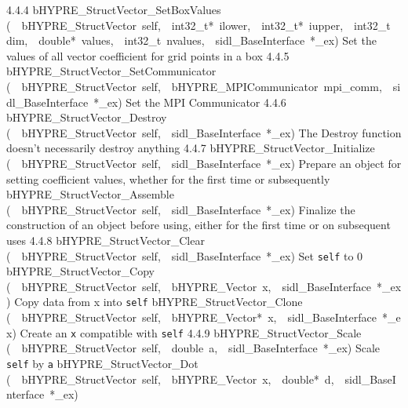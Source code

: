\documentclass{article}
\begin{document}
\begin{cxxentry}
\begin{cxxentry}
\begin{cxxnames}
        {4.4.4}
        {bHYPRE\_StructVector\_SetBoxValues}
        {(\ \ bHYPRE\_StructVector\ self,\ \ int32\_t*\ ilower,\ \ int32\_t*\ iupper,\ \ int32\_t\ dim,\ \ double*\ values,\ \ int32\_t\ nvalues,\ \ sidl\_BaseInterface\ *\_ex)}
        {
Set the values of all vector coefficient for grid points in a box}
        {4.4.5}
        {bHYPRE\_StructVector\_SetCommunicator}
        {(\ \ bHYPRE\_StructVector\ self,\ \ bHYPRE\_MPICommunicator\ mpi\_comm,\ \ sidl\_BaseInterface\ *\_ex)}
        {
Set the MPI Communicator}
        {4.4.6}
        {bHYPRE\_StructVector\_Destroy}
        {(\ \ bHYPRE\_StructVector\ self,\ \ sidl\_BaseInterface\ *\_ex)}
        {
The Destroy function doesn't necessarily destroy anything}
        {4.4.7}
        {bHYPRE\_StructVector\_Initialize}
        {(\ \ bHYPRE\_StructVector\ self,\ \ sidl\_BaseInterface\ *\_ex)}
        {
Prepare an object for setting coefficient values, whether for
the first time or subsequently}
        {}
\label{cxx.4.4.16}
        {bHYPRE\_StructVector\_Assemble}
        {(\ \ bHYPRE\_StructVector\ self,\ \ sidl\_BaseInterface\ *\_ex)}
        {
Finalize the construction of an object before using, either
for the first time or on subsequent uses}
        {4.4.8}
        {bHYPRE\_StructVector\_Clear}
        {(\ \ bHYPRE\_StructVector\ self,\ \ sidl\_BaseInterface\ *\_ex)}
        {
Set {\tt self} to 0}
        {}
\label{cxx.4.4.17}
        {bHYPRE\_StructVector\_Copy}
        {(\ \ bHYPRE\_StructVector\ self,\ \ bHYPRE\_Vector\ x,\ \ sidl\_BaseInterface\ *\_ex)}
        {
Copy data from x into {\tt self}}
        {}
\label{cxx.4.4.18}
        {bHYPRE\_StructVector\_Clone}
        {(\ \ bHYPRE\_StructVector\ self,\ \ bHYPRE\_Vector*\ x,\ \ sidl\_BaseInterface\ *\_ex)}
        {
Create an {\tt x} compatible with {\tt self}}
        {4.4.9}
        {bHYPRE\_StructVector\_Scale}
        {(\ \ bHYPRE\_StructVector\ self,\ \ double\ a,\ \ sidl\_BaseInterface\ *\_ex)}
        {
Scale {\tt self} by {\tt a}}
        {}
\label{cxx.4.4.19}
        {bHYPRE\_StructVector\_Dot}
        {(\ \ bHYPRE\_StructVector\ self,\ \ bHYPRE\_Vector\ x,\ \ double*\ d,\ \ sidl\_BaseInterface\ *\_ex)}
        {
}
\end{cxxnames}
\end{cxxentry}
\end{cxxentry}
\end{document}
